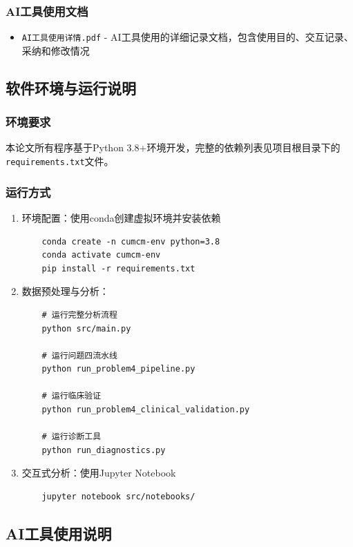 \documentclass[withoutpreface]{cumcmthesis}
\begin{document}
\subsubsection{AI工具使用文档}
\begin{itemize}
    \item \texttt{AI工具使用详情.pdf} - AI工具使用的详细记录文档，包含使用目的、交互记录、采纳和修改情况
\end{itemize}

\subsection{软件环境与运行说明}

\subsubsection{环境要求}
本论文所有程序基于Python 3.8+环境开发，完整的依赖列表见项目根目录下的\texttt{requirements.txt}文件。

\subsubsection{运行方式}
\begin{enumerate}
    \item 环境配置：使用conda创建虚拟环境并安装依赖
    \begin{verbatim}
    conda create -n cumcm-env python=3.8
    conda activate cumcm-env
    pip install -r requirements.txt
    \end{verbatim}
    
    \item 数据预处理与分析：
    \begin{verbatim}
    # 运行完整分析流程
    python src/main.py
    
    # 运行问题四流水线
    python run_problem4_pipeline.py
    
    # 运行临床验证
    python run_problem4_clinical_validation.py
    
    # 运行诊断工具
    python run_diagnostics.py
    \end{verbatim}
    
    \item 交互式分析：使用Jupyter Notebook
    \begin{verbatim}
    jupyter notebook src/notebooks/
    \end{verbatim}
\end{enumerate}

\subsection{AI工具使用说明}
\end{document}
